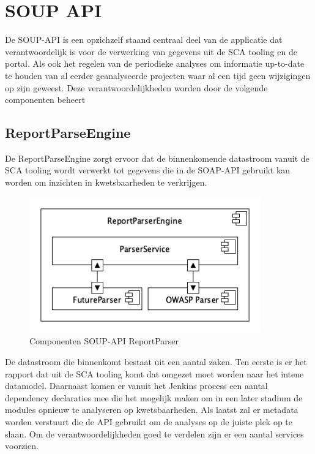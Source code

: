 \section{SOUP API}\label{sec:soup-api}
De SOUP-API is een opzichzelf staand centraal deel van de applicatie dat verantwoordelijk is voor de verwerking van gegevens uit de SCA tooling en de portal. Als ook het regelen van de periodieke analyses om informatie up-to-date te houden van al eerder geanalyseerde projecten waar al een tijd geen wijzigingen op zijn geweest. Deze verantwoordelijkheden worden door de volgende componenten beheert

\subsection{ReportParseEngine}\label{subsec:reportparseengine}
De ReportParseEngine zorgt ervoor dat de binnenkomende datastroom vanuit de SCA tooling wordt verwerkt tot gegevens die in de SOAP-API gebruikt kan worden om inzichten in kwetsbaarheden te verkrijgen.

\begin{figure}[bth]
    \myfloatalign
    \includegraphics[width=10cm]{gfx/umlet/exports/ReportParserComponents}
    \caption{Componenten SOUP-API ReportParser}
    \label{fig:SOUPAPIReportParserComps}
\end{figure}

De datastroom die binnenkomt bestaat uit een aantal zaken. Ten eerste is er het rapport dat uit de SCA tooling komt dat omgezet moet worden naar het intene datamodel. Daarnaast komen er vanuit het Jenkins process een aantal dependency declaraties mee die het mogelijk maken om in een later stadium de modules opnieuw te analyseren op kwetsbaarheden. Als laatst zal er metadata worden verstuurt die de API gebruikt om de analyses op de juiste plek op te slaan. Om de verantwoordelijkheden goed te verdelen zijn er een aantal services voorzien.

